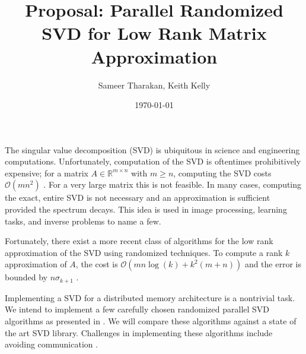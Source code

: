 \documentclass[a4paper]{article}
\title{Proposal: Parallel Randomized SVD for Low Rank Matrix Approximation}
\date{\today}
\author{Sameer Tharakan, Keith Kelly}
\begin{document}
\maketitle

The singular value decomposition (SVD) is ubiquitous in science and engineering computations. 
Unfortunately, computation of the SVD is oftentimes prohibitively expensive; for a matrix $A\in\mathbb{R}^{m \times n}$ with $m\geq n$, computing the SVD costs $\mathcal{O}(mn^2)$ \cite{golub2012matrix}.
For a very large matrix this is not feasible.
In many cases, computing the exact, entire SVD is not necessary and an approximation is sufficient provided the spectrum decays. 
This idea is used in image processing, learning tasks, and inverse problems to name a few.

Fortunately, there exist a more recent class of algorithms for the low rank approximation of the SVD using randomized techniques.
To compute a rank $k$ approximation of $A$, the cost is $\mathcal{O}(mn\log(k) + k^2(m+n))$ and the error is bounded by $n\sigma_{k+1}$ \cite{halko2011finding}.

Implementing a SVD for a distributed memory architecture is a nontrivial task. We intend to implement a few carefully chosen randomized parallel SVD algorithms as presented in \cite{halko2011finding}.
We will compare these algorithms against a state of the art SVD library.
Challenges in implementing these algorithms include avoiding communication \cite{ballard2010minimizing}.

{
}
\end{document}
